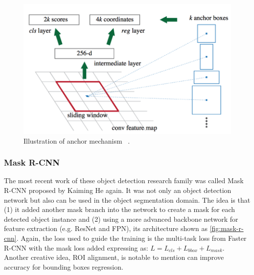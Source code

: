 \begin{figure}
    \begin{center}
    \includegraphics[scale=0.6]{figures/anchor.png}
    \end{center}
    \caption{Illustration of anchor mechanism
    ~\protect\cite{faster-r-cnn-paper-2015}.}
    \label{fig:anchor}
\end{figure}


\subsubsection{Mask R-CNN}

The most recent work of these object detection research family was called Mask
R-CNN \cite{mask-r-cnn-paper-2017} proposed
by Kaiming He again. It was not only an object detection network but also can be
used in the object segmentation domain. The idea
is that (1) it added another mask branch into the network to create a mask for
each detected object instance and (2) using a
more advanced backbone network for feature extraction (e.g. ResNet and FPN),
its architecture shown as \autoref{fig:mask-r-cnn}.
Again, the loss used to guide the training is the multi-task loss from Faster
R-CNN with the mask loss added expressing as:
$L = L_{cls} + L_{bbox} + L_{mask}$. Another creative idea, ROI alignment, is
notable to mention can improve
accuracy for bounding boxes regression.

